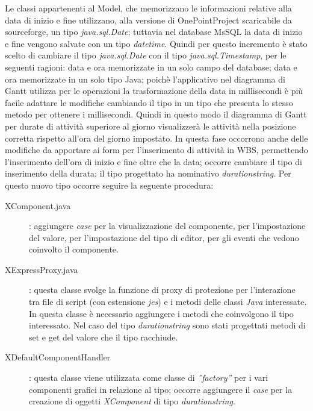 Le classi appartenenti al Model, che memorizzano le informazioni relative alla data di inizio e fine utilizzano, alla versione di OnePointProject scaricabile da sourceforge, un tipo \textit{java.sql.Date}; tuttavia nel database MsSQL la data di inizio e fine vengono salvate con un tipo \textit{datetime}. Quindi per questo incremento \`{e} stato scelto di cambiare il tipo \textit{java.sql.Date} con il tipo \textit{java.sql.Timestamp}, per le seguenti ragioni: data e ora memorizzate in un solo campo del database; data e ora memorizzate in un solo tipo Java; poich\`{e} l\textquoteright{}applicativo nel diagramma di Gantt utilizza per le operazioni la trasformazione della data in millisecondi \`{e} pi\`{u} facile adattare le modifiche cambiando il tipo in un tipo che presenta lo stesso metodo per ottenere i millisecondi. Quindi in questo modo il diagramma di Gantt per durate di attivit\`{a} superiore al giorno visualizzer\`{a} le attivit\`{a} nella posizione corretta rispetto all\textquoteright{}ora del giorno impostato. In questa fase occorrono anche delle modifiche da apportare ai form per l\textquoteright{}inserimento di attivit\`{a} in WBS, permettendo l\textquoteright{}inserimento dell\textquoteright{}ora di inizio e fine oltre che la data; occorre cambiare il tipo di inserimento della durata; il tipo progettato ha nominativo \textit{durationstring}. Per questo nuovo tipo occorre seguire la seguente procedura:
\begin{description}
\item[XComponent.java]: aggiungere \textit{case} per la visualizzazione del componente, per l\textquoteright{}impostazione del valore, per l\textquoteright{}impostazione del tipo di editor, per gli eventi che vedono coinvolto il componente.
\item[XExpressProxy.java]: questa classe svolge la funzione di proxy di protezione per l\textquoteright{}interazione tra file di script (con estensione \textit{jes}) e i metodi delle classi \textit{Java} interessate. In questa classe \`{e} necessario aggiungere i metodi che coinvolgono il tipo interessato. Nel caso del tipo \textit{durationstring} sono stati progettati metodi di set e get del valore che il tipo racchiude.
\item[XDefaultComponentHandler]: questa classe viene utilizzata come classe di \textit{''factory''} per i vari componenti grafici in relazione al tipo; occorre aggiungere il \textit{case} per la creazione di oggetti \textit{XComponent} di tipo \textit{durationstring}.
\end{description}

